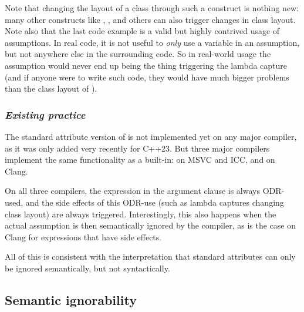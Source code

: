Note that changing the layout of a class through such a construct is nothing new: many other constructs like , , and others can also trigger changes in class layout. Note also that the last code example is a valid but highly contrived usage of assumptions. In real code, it is not useful to \emph{only} use a variable in an assumption, but not anywhere else in the surrounding code. So in real-world usage the assumption would never end up being the thing triggering the lambda capture (and if anyone were to write such code, they would have much bigger problems than the class layout of ).

\subsubsection*{\emph{Existing practice}}

The standard attribute version of  is not implemented yet on any major compiler, as it was only added very recently for C++23. But three major compilers implement the same functionality as a built-in:  on MSVC and ICC, and \mbox{} on Clang.

On all three compilers, the expression in the argument clause is always ODR-used, and the side effects of this ODR-use (such as lambda captures changing class layout) are always triggered. Interestingly, this also happens when the actual assumption is then semantically ignored by the compiler, as is the case on Clang for expressions that have side effects.

All of this is consistent with the interpretation that standard attributes can only be ignored semantically, but not syntactically.

\subsection{Semantic ignorability}
\label{subsec:semantic}

